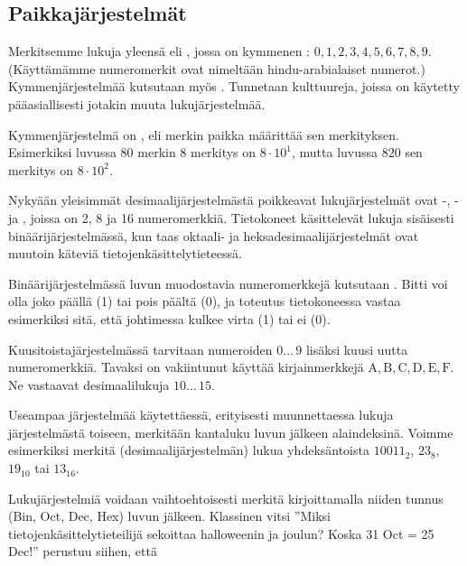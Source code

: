 \subsection*{Paikkajärjestelmät}

Merkitsemme lukuja yleensä  eli , jossa on kymmenen : $0, 1, 2, 3, 4, 5, 6, 7, 8, 9$. (Käyttämämme numeromerkit ovat nimeltään hindu-arabialaiset numerot.) Kymmenjärjestelmää kutsutaan myös . Tunnetaan kulttuureja, joissa on käytetty pääasiallisesti jotakin muuta lukujärjestelmää.

Kymmenjärjestelmä on , eli merkin paikka määrittää sen merkityksen.
Esimerkiksi luvussa $80$ merkin 8 merkitys on $8 \cdot 10^1$, mutta luvussa $820$ sen merkitys on $8 \cdot 10^2$.

Nykyään yleisimmät desimaalijärjestelmästä poikkeavat lukujärjestelmät ovat -, - ja , joissa on 2, 8 ja 16 numeromerkkiä. Tietokoneet käsittelevät lukuja sisäisesti binäärijärjestelmässä, kun taas oktaali- ja heksadesimaalijärjestelmät ovat muutoin käteviä tietojenkäsittelytieteessä.

Binäärijärjestelmässä luvun muodostavia numeromerkkejä kutsutaan . Bitti voi olla joko päällä (1) tai pois päältä (0), ja toteutus tietokoneessa vastaa esimerkiksi sitä, että johtimessa kulkee virta (1) tai ei (0).


Kuusitoistajärjestelmässä tarvitaan numeroiden $0 \ldots \, 9$ lisäksi kuusi uutta numeromerkkiä. Tavaksi on vakiintunut käyttää kirjainmerkkejä $\mathrm{A, B, C, D, E, F}$. Ne vastaavat desimaalilukuja $10 \ldots \, 15$.

Useampaa järjestelmää käytettäessä, erityisesti muunnettaessa lukuja järjestelmästä toiseen, merkitään kantaluku luvun jälkeen alaindeksinä. Voimme esimerkiksi merkitä (desimaalijärjestelmän) lukua yhdeksäntoista $10011_{2}$, $23_{8}$, $19_{10}$ tai $13_{16}$.

Lukujärjestelmiä voidaan vaihtoehtoisesti merkitä kirjoittamalla niiden tunnus (Bin, Oct, Dec, Hex) luvun jälkeen.
Klassinen vitsi ''Miksi tietojenkäsittelytieteilijä sekoittaa halloweenin ja joulun? Koska 31 Oct = 25 Dec!'' perustuu siihen, että


